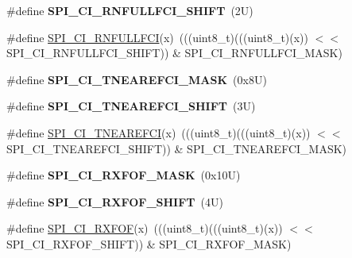 \begin{DoxyCompactItemize}
\#define {\bfseries S\+P\+I\+\_\+\+C\+I\+\_\+\+R\+N\+F\+U\+L\+L\+F\+C\+I\+\_\+\+S\+H\+I\+FT}~(2\+U)
\item 
\#define \mbox{\hyperlink{group___s_p_i___register___masks_gaef408e3e992d7c0d81ef75ada6be576f}{S\+P\+I\+\_\+\+C\+I\+\_\+\+R\+N\+F\+U\+L\+L\+F\+CI}}(x)~(((uint8\+\_\+t)(((uint8\+\_\+t)(x)) $<$$<$ S\+P\+I\+\_\+\+C\+I\+\_\+\+R\+N\+F\+U\+L\+L\+F\+C\+I\+\_\+\+S\+H\+I\+FT)) \& S\+P\+I\+\_\+\+C\+I\+\_\+\+R\+N\+F\+U\+L\+L\+F\+C\+I\+\_\+\+M\+A\+SK)
\item 
\mbox{\label{group___s_p_i___register___masks_gacd5fd3e6e90bfa8948b589ee7ca580c4}} 
\#define {\bfseries S\+P\+I\+\_\+\+C\+I\+\_\+\+T\+N\+E\+A\+R\+E\+F\+C\+I\+\_\+\+M\+A\+SK}~(0x8\+U)
\item 
\mbox{\label{group___s_p_i___register___masks_gaa7b766bb397310da69582b677d86a96c}} 
\#define {\bfseries S\+P\+I\+\_\+\+C\+I\+\_\+\+T\+N\+E\+A\+R\+E\+F\+C\+I\+\_\+\+S\+H\+I\+FT}~(3\+U)
\item 
\#define \mbox{\hyperlink{group___s_p_i___register___masks_ga7511ed45f190c0c24b481bfb0a5591e3}{S\+P\+I\+\_\+\+C\+I\+\_\+\+T\+N\+E\+A\+R\+E\+F\+CI}}(x)~(((uint8\+\_\+t)(((uint8\+\_\+t)(x)) $<$$<$ S\+P\+I\+\_\+\+C\+I\+\_\+\+T\+N\+E\+A\+R\+E\+F\+C\+I\+\_\+\+S\+H\+I\+FT)) \& S\+P\+I\+\_\+\+C\+I\+\_\+\+T\+N\+E\+A\+R\+E\+F\+C\+I\+\_\+\+M\+A\+SK)
\item 
\mbox{\label{group___s_p_i___register___masks_ga6b8eba03abc577d6c6aec486f753b713}} 
\#define {\bfseries S\+P\+I\+\_\+\+C\+I\+\_\+\+R\+X\+F\+O\+F\+\_\+\+M\+A\+SK}~(0x10\+U)
\item 
\mbox{\label{group___s_p_i___register___masks_ga03a5fc7acce88b2c4e92c99d19a4aafd}} 
\#define {\bfseries S\+P\+I\+\_\+\+C\+I\+\_\+\+R\+X\+F\+O\+F\+\_\+\+S\+H\+I\+FT}~(4\+U)
\item 
\#define \mbox{\hyperlink{group___s_p_i___register___masks_ga98aaecb6f87c190a4d26e3123e347b5d}{S\+P\+I\+\_\+\+C\+I\+\_\+\+R\+X\+F\+OF}}(x)~(((uint8\+\_\+t)(((uint8\+\_\+t)(x)) $<$$<$ S\+P\+I\+\_\+\+C\+I\+\_\+\+R\+X\+F\+O\+F\+\_\+\+S\+H\+I\+FT)) \& S\+P\+I\+\_\+\+C\+I\+\_\+\+R\+X\+F\+O\+F\+\_\+\+M\+A\+SK)
\item 
\mbox{\label{group___s_p_i___register___masks_ga16c19163e273f02921ac06d03a666e82}} 
$$
\end{DoxyCompactItemize}
